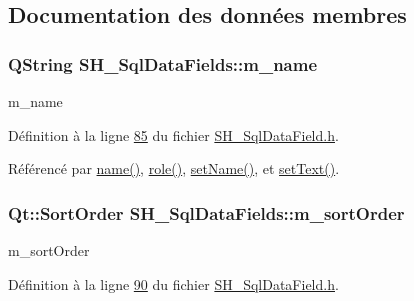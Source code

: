 \subsection{Documentation des données membres}
\hypertarget{classSH__SqlDataFields_a3c0e82a8b6652335bdc53b211d39d4e2}{
\subsubsection[{m\-\_\-name}]{\setlength{\rightskip}{0pt plus 5cm}Q\-String S\-H\-\_\-\-Sql\-Data\-Fields\-::m\-\_\-name\hspace{0.3cm}{\ttfamily [private]}}}\label{classSH__SqlDataFields_a3c0e82a8b6652335bdc53b211d39d4e2}


m\-\_\-name 



Définition à la ligne \hyperlink{SH__SqlDataField_8h_source_l00085}{85} du fichier \hyperlink{SH__SqlDataField_8h_source}{S\-H\-\_\-\-Sql\-Data\-Field.\-h}.



Référencé par \hyperlink{classSH__SqlDataFields_a4951291928ce837435411166d66a5a3f}{name()}, \hyperlink{classSH__SqlDataFields_a6e5a9b95f0249a85ccf2fd0844ab7170}{role()}, \hyperlink{classSH__SqlDataFields_a8d7b864a4ad5513af9e4c47a0d9919e8}{set\-Name()}, et \hyperlink{classSH__SqlDataFields_ae098408de73ecbd532de8f44dea2b6d0}{set\-Text()}.

\hypertarget{classSH__SqlDataFields_aa5dbfa2beef7114fba275d61135a6760}{
\subsubsection[{m\-\_\-sort\-Order}]{\setlength{\rightskip}{0pt plus 5cm}Qt\-::\-Sort\-Order S\-H\-\_\-\-Sql\-Data\-Fields\-::m\-\_\-sort\-Order\hspace{0.3cm}{\ttfamily [private]}}}\label{classSH__SqlDataFields_aa5dbfa2beef7114fba275d61135a6760}


m\-\_\-sort\-Order 



Définition à la ligne \hyperlink{SH__SqlDataField_8h_source_l00090}{90} du fichier \hyperlink{SH__SqlDataField_8h_source}{S\-H\-\_\-\-Sql\-Data\-Field.\-h}.



